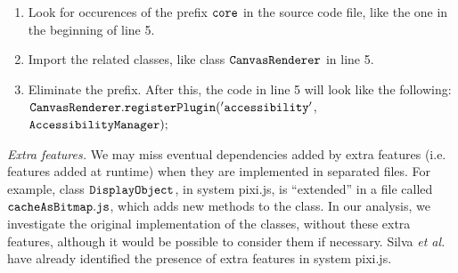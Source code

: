 \documentclass[review]{elsarticle}
\newcommand{\aspas}[1]{{``#1''}}
\newcommand{\mcode}[1]{$\tt #1$}
\begin{document}
\begin{enumerate}
	\item Look for occurences of the prefix \mcode{core} in the source code file, like the one in the beginning of line 5.
	\item Import the related classes, like class \mcode{CanvasRenderer} in line 5.
	\item Eliminate the prefix. After this, the code in line 5 will look like the following:  \mcode{CanvasRenderer.registerPlugin('accessibility'},\\ \mcode{AccessibilityManager);}
\end{enumerate}

\vspace{2.5 mm}

\noindent \textit{Extra features.} We may miss eventual dependencies added by extra features (i.e. features added at runtime) when they are implemented in separated files. For example, class \mcode{DisplayObject}, in system {\sc pixi.js}, is \aspas{extended} in a file called \mcode{cacheAsBitmap.js}, which adds new methods to the class. In our analysis, we investigate the original implementation of the classes, without these extra features, although it would be possible to consider them if necessary. Silva \emph{et al.}~\cite{icsr2017} have already identified the presence of extra features in system {\sc pixi.js}. 


\end{document}
